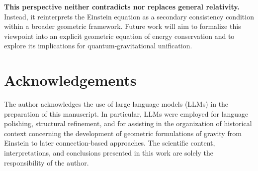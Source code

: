 \documentclass[%
 reprint,
 amsmath,amssymb,
 aps,
 prb,
]{revtex4-2}
\numberwithin{equation}{section}
\begin{document}
\textbf{This perspective neither contradicts nor replaces general relativity.} Instead, it reinterprets the Einstein equation as a secondary consistency condition within a broader geometric framework. Future work will aim to formalize this viewpoint into an explicit geometric equation of energy conservation and to explore its implications for quantum-gravitational unification.

\section*{Acknowledgements}

The author acknowledges the use of large language models (LLMs) in the preparation of this manuscript. In particular, LLMs were employed for language polishing, structural refinement, and for assisting in the organization of historical context concerning the development of geometric formulations of gravity from Einstein to later connection-based approaches. The scientific content, interpretations, and conclusions presented in this work are solely the responsibility of the author.
\end{document}
